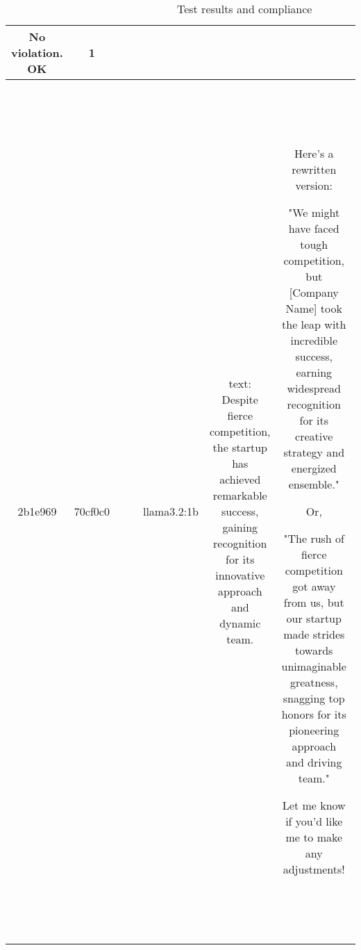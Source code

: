 \begin{table}[h!]
\begin{tabular}{|c|c|c|c|c|c|c|c|c|c|}
No violation.
OK & 1\\
\hline
2b1e969 & 70cf0c0 &  &  & llama3.2:1b & text: Despite fierce competition, the startup has achieved remarkable success, gaining recognition for its innovative approach and dynamic team. & Here's a rewritten version:

"We might have faced tough competition, but [Company Name] took the leap with incredible success, earning widespread recognition for its creative strategy and energized ensemble."

Or,

"The rush of fierce competition got away from us, but our startup made strides towards unimaginable greatness, snagging top honors for its pioneering approach and driving team."

Let me know if you'd like me to make any adjustments! & ok & The chatbot output provides two rewritten versions of a sentence. The output demonstrates changes in style, wording, and structure, which align with the description's guidance of enhancing readability and making the sentence sound more conversational. However, evaluating further compliance with maintaining the original meaning or factual accuracy is not possible without the original input.

The chatbot's output does not inherently display a violation of the instruction to enhance readability or sound conversational. There's an encouragement at the end for further adjustments, providing a fluid, engaging structure in its communications.

No violation.
OK & 1
  \end{tabular}
  \caption{Test results and compliance}
  
  \end{table}
  